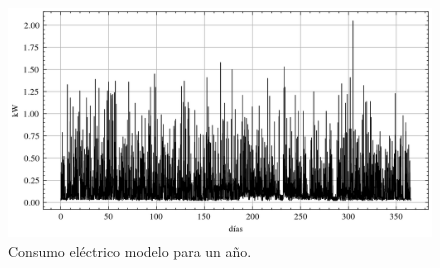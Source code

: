 \begin{figure}[h] \centering
	\centering
	\includegraphics[width=1\textwidth]{./capitulos/adquisicion_de_datos/images/p_demand_year.png}
	\caption{Consumo eléctrico modelo para un año.}
	\label{fig:p_demand_year}
\end{figure}
